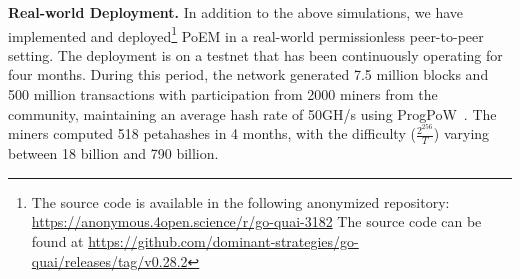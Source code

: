 \noindent
\textbf{Real-world Deployment.}
In addition to the above simulations,
we have implemented and deployed\footnote{
    \ifanonymous
        The source code is available in the following anonymized repository:
        \url{https://anonymous.4open.science/r/go-quai-3182}
    \else
        The source code can be found at
        \url{https://github.com/dominant-strategies/go-quai/releases/tag/v0.28.2}
    \fi
} PoEM in a real-world permissionless peer-to-peer
setting.
The deployment is on a testnet that has been continuously operating for
four months. During this period, the network generated 7.5 million blocks
and 500 million transactions
with participation from 2000 miners from the community, maintaining an
average hash rate of 50GH/s using ProgPoW~\cite{progpow}.
The miners computed 518 petahashes in 4 months,
with the difficulty ($\frac{2^{256}}{T}$)
varying between 18 billion and 790 billion.

